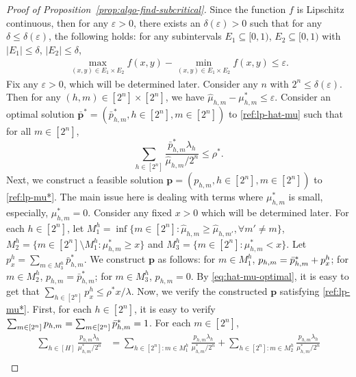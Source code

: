 \documentclass[11pt, reqno]{article}
\numberwithin{equation}{section}
\numberwithin{theorem}{section}
\begin{document}
\begin{proof}[Proof of Proposition~\ref{prop:algo-find-subcritical}]
    Since the function $f$ is Lipschitz continuous, then for any $\varepsilon>0$, there exists an $\delta(\varepsilon)>0$ such that for any $\delta\leq \delta(\varepsilon)$, the following holds: for any subintervals $E_1\subseteq[0,1)$, $E_2\subseteq[0,1)$ with $|E_1|\leq \delta$, $|E_2|\leq \delta$,
\begin{align}
    \max_{(x,y)\in E_1\times E_2}f(x,y)-\min_{(x,y)\in E_1\times E_2}f(x,y)\leq \varepsilon.
\end{align}
Fix any $\varepsilon>0$, which will be determined later. Consider any $n$ with $2^n\leq \delta(\varepsilon)$. Then for any $(h,m)\in[2^n]\times [2^n]$, we have $ \hat{\mu}_{h,m}-\mu^*_{h,m}\leq \varepsilon$.
Consider an optimal solution $\bar{\mathbf{p}}^*=(\bar{p}^*_{h,m},h\in[2^n],m\in[2^n])$ to \eqref{ref:lp-hat-mu} such that for all $m\in[2^n]$, 
\begin{equation}\label{eq:hat-mu-optimal}
    \sum_{h\in[2^n]}\frac{\bar{p}^*_{h,m}\lambda_h}{\hat{\mu}_{h,m}/2^n}\leq \rho^*.
\end{equation}
Next, we construct a feasible solution $\mathbf{p}=(p_{h,m},h\in[2^n],m\in[2^n])$ to \eqref{ref:lp-mu*}. The main issue here is dealing with terms where $\mu^*_{h,m}$ is small, especially, $\mu^*_{h,m}=0$. Consider any fixed $x>0$ which will be determined later. For each $h\in[2^n]$, let $M^h_1=\inf\{m\in[2^n]:\hat{\mu}_{h,m}\geq \hat{\mu}_{h,m'},\forall m'\neq m\}$, $M^h_2=\{m\in[2^n]\setminus M^h_1: \mu^*_{h,m}\geq x\}$ and $M^h_3=\{m\in [2^n]: \mu^*_{h,m}<x\}$. Let $p^h_x=\sum_{m\in M^h_3}\bar{p}^*_{h,m}$. We construct $\mathbf{p}$ as follows: for $m\in M^h_1$, $p_{h,m}=\Bar{p}^*_{h,m}+p^h_x$; for $m\in M^h_2$, $p_{h,m}=\bar{p}^*_{h,m}$; for $m\in M^h_3$, $p_{h,m}=0$. By \eqref{eq:hat-mu-optimal}, it is easy to get that $\sum_{h\in[2^n]}p^h_x\leq \rho^* x/\lambda$. Now, we verify the constructed $\mathbf{p}$ satisfying \eqref{ref:lp-mu*}. First, for each $h\in[2^n]$, it is easy to verify $\sum_{m\in[2^n]}p_{h,m}=\sum_{m\in[2^n]}\Bar{p}^*_{h,m}=1$. 
For each $m\in[2^n]$,
\begin{align}\label{eq:verify-pkm}
    \sum_{h\in[H]}\frac{p_{h,m}\lambda_h}{\mu^*_{h,m}/2^n}&=\sum_{h\in[2^n]: m\in M^h_1}\frac{p_{h,m}\lambda_h}{\mu^*_{h,m}/2^n}+\sum_{h\in[2^n]: m\in M^h_2}\frac{p_{h,m}\lambda_h}{\mu^*_{h,m}/2^n}\nonumber\\

\end{align}
\end{proof}
\end{document}
